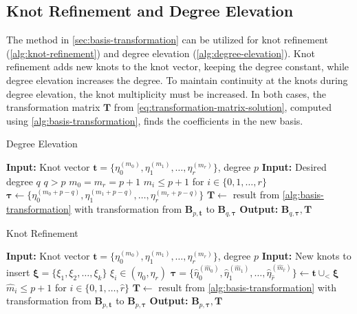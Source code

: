 \subsection{Knot Refinement and Degree Elevation}\label{sec:knot-refinement-degree-elevation}
The method in \cref{sec:basis-transformation} can be utilized for knot refinement (\cref{alg:knot-refinement}) and degree elevation (\cref{alg:degree-elevation}). Knot refinement adds new knots to the knot vector, keeping the degree constant, while degree elevation increases the degree. To maintain continuity at the knots during degree elevation, the knot multiplicity must be increased. In both cases, the transformation matrix $\mathbf T$ from \cref{eq:transformation-matrix-solution}, computed using \cref{alg:basis-transformation}, finds the coefficients in the new basis.

\begin{algorithm}
    \caption{Degree Elevation}\label{alg:degree-elevation}
    \begin{algorithmic}[1]
        \State \textbf{Input:} Knot vector $\mathbf t = \{\eta_0^{(m_0)}, \eta_1^{(m_1)}, \dots, \eta_r^{(m_r)}\}$, degree $p$
        \State \textbf{Input:} Desired degree $q$
        \Ensure $q > p$
        \Ensure $m_0 = m_r = p+1$
        \Ensure $m_i \leq p+1$ for $i \in \{0,1,\ldots,r\}$
        \State $\boldsymbol\tau \gets \{\eta_0^{(m_0+p-q)}, \eta_1^{(m_1+p-q)}, \dots, \eta_r^{(m_r+p-q)}\}$
        \State $\mathbf T \gets $ result from \cref{alg:basis-transformation} with transformation from $\mathbf B_{p,\mathbf t}$ to $\mathbf B_{q,\boldsymbol \tau}$
        \State \textbf{Output:} $\mathbf B_{q, \boldsymbol \tau}, \mathbf T$
    \end{algorithmic}
\end{algorithm}

\begin{algorithm}
    \caption{Knot Refinement}\label{alg:knot-refinement}
    \begin{algorithmic}[1]
        \State \textbf{Input:} Knot vector $\mathbf t = \{\eta_0^{(m_0)}, \eta_1^{(m_1)}, \dots, \eta_r^{(m_r)}\}$, degree $p$
        \State \textbf{Input:} New knots to insert $\boldsymbol \xi = \{\xi_1, \xi_2, \dots, \xi_k\}$
        \Ensure $\xi_i \in (\eta_0, \eta_r)$
        \State $\boldsymbol \tau = \{\hat\eta_0^{(\hat m_0)}, \hat\eta_1^{(\hat m_1)}, \dots, \hat\eta_{\hat r}^{(\hat m_{\hat r})}\} \gets \mathbf t \cup_< \boldsymbol \xi$ 
        \Ensure $\hat m_i \leq p+1$ for $i \in \{0,1,\ldots,\hat r\}$
        \State $\mathbf T \gets $ result from \cref{alg:basis-transformation} with transformation from $\mathbf B_{p,\mathbf t}$ to $\mathbf B_{p,\boldsymbol \tau}$
        \State \textbf{Output:} $\mathbf B_{p, \boldsymbol \tau}, \mathbf T$
    \end{algorithmic}
\end{algorithm}


